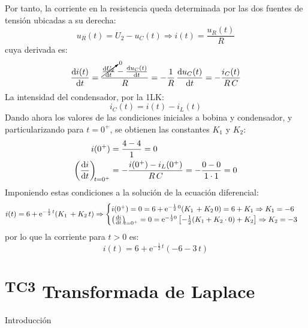 \begin{example}
  Por tanto, la corriente en la resistencia queda determinada por las
  dos fuentes de tensión ubicadas a su derecha:
  \begin{equation*}
    u_R(t)=U_2-u_C(t)\Rightarrow i(t)=\dfrac{u_R(t)}{R}
  \end{equation*}
  cuya derivada es:
  \begin{equation*}
    \diff{i(t)}{t}=\dfrac{\cancelto{0}{\diff{U_2}{t}}-\diff{u_C(t)}{t}}{R}=-\dfrac{1}{R}\,\diff{u_C(t)}{t}=-\dfrac{i_C(t)}{R\,C}
  \end{equation*}
  La intensidad del condensador, por la 1LK:
  \begin{equation*}
    i_C(t)=i(t)-i_L(t)
  \end{equation*}
  Dando ahora los valores de las condiciones iniciales a bobina y
  condensador, y particularizando para $t=0^+$, se obtienen las
  constantes $K_1$ y $K_2$:
  \begin{align*}
    i(0^+)&=\dfrac{4-4}{1}=0\\
    \diff{i}{t}[t = 0^+]&=-\dfrac{i(0^+)-i_L(0^+)}{R\,C}=-\dfrac{0-0}{1\cdot 1}=0
  \end{align*}
  Imponiendo estas condiciones a la solución de la ecuación
  diferencial:
  \begin{equation*}
    i(t)=6+\mathrm{e}^{-\frac{1}{2}\,t}(K_1\,+K_2\,t)\Rightarrow
    \begin{cases}
      i(0^+)=0=6+\mathrm{e}^{-\frac{1}{2}\,0}(K_1\,+K_2\,0)=6+K_1\Rightarrow K_1=-6\\
      \diff{i}{t}[t = 0^+]=0=\mathrm{e}^{-\frac{1}{2}0}\left[-\frac{1}{2}(K_1+K_2\cdot 0)+K_2 \right]\Rightarrow K_2=-3
    \end{cases}
  \end{equation*}
  por lo que la corriente para $t>0$ es:
  \begin{equation*}
    i(t)=6+\mathrm{e}^{-\frac{1}{2}\,t}(-6-3\,t)
  \end{equation*}
	    
\end{example}

\section{\textsuperscript{TC3} Transformada de Laplace}
\label{sec:laplace}

{Introducción}

